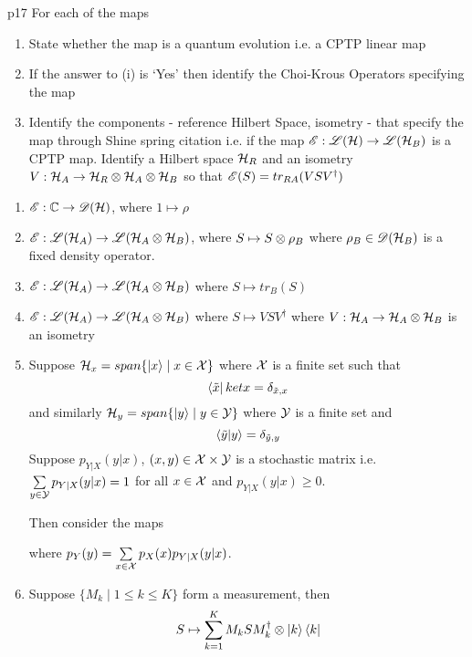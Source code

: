 \documentclass[a4paper, 11pt]{article}
\begin{document}
\begin{problem}{%
	}{p17%
	}
	For each of the maps \begin{enumerate}[label=(\roman*)]
		\item State whether the map is a quantum evolution i.e. a CPTP linear map
		\item If the answer to (i) is `Yes' then identify the Choi-Krous Operators specifying the map
		\item Identify the components - reference Hilbert Space, isometry - that specify the map through Shine spring citation i.e. if the map ${\mathscr{E}}:{\mathscr{L}}(\mathcal{H})\to {\mathscr{L}}(\mathcal{H}_B)$ is a CPTP map. Identify a Hilbert space $\mathcal{H}_R$ and an isometry $V:\mathcal{H}_A\to \mathcal{H}_R\otimes \mathcal{H}_A\otimes \mathcal{H}_B$ so that ${\mathscr{E}}(S)=tr_{RA}(VSV^{\dagger})$
	\end{enumerate}
		\begin{enumerate}[label=(\arabic*)]
			\item ${\mathscr{E}}:\mathbb{C}\to {\mathscr{D}}(\mathcal{H})$, where $1\mapsto \rho$
			\item ${\mathscr{E}}:{\mathscr{L}}(\mathcal{H}_A)\to {\mathscr{L}}(\mathcal{H}_A\otimes \mathcal{H}_B)$, where $S\mapsto S\otimes \rho_B$ where $\rho_B\in {\mathscr{D}}(\mathcal{H}_B)$ is a fixed density operator.
			\item ${\mathscr{E}}:{\mathscr{L}}(\mathcal{H}_A)\to {\mathscr{L}}(\mathcal{H}_A\otimes \mathcal{H}_B)$ where $S\mapsto tr_B(S)$
			\item ${\mathscr{E}}:{\mathscr{L}}(\mathcal{H}_A)\to {\mathscr{L}}(\mathcal{H}_A\otimes \mathcal{H}_B)$ where $S\mapsto VSV^{\dagger}$ where $V:\mathcal{H}_A\to\mathcal{H}_A\otimes \mathcal{H}_B$ is an isometry
			\item Suppose $\mathcal{H}_x=span\{\ket{x}\mid x\in \mathcal{X}\}$ where $\mathcal{X}$ is a finite set such that $$\bra{\tilde{x}}ket{x}=\delta_{\tilde{x},x}$$and similarly $\mathcal{H}_y = span\{\ket{y}\mid y\in \mathcal{Y}\}$ where $\mathcal{Y}$ is a finite set and $$\bra{\tilde{y}}\ket{y}=\delta_{\tilde{y},y}$$Suppose $p_{Y|X}(y|x)$, $(x,y)\in \mathcal{X}\times \mathcal{Y}$ is a stochastic matrix i.e. $\sum\limits_{y\in \mathcal{Y}}p_{Y|X}(y|x)=1$ for all $x\in \mathcal{X}$ and $p_{Y|X}(y|x)\geq 0$.
				
			Then consider the maps \begin{center}
			\end{center}where $p_Y(y)=\sum\limits_{x\in \mathcal{X}}p_X(x)p_{Y|X}(y|x)$.
			\item Suppose $\{M_k\mid 1\leq k\leq K\}$ form a measurement, then $$S\mapsto \sum_{k=1}^KM_kSM_k^{\dagger}\otimes \ket{k}\bra{k}$$
		\end{enumerate}

\end{problem}
\end{document}
